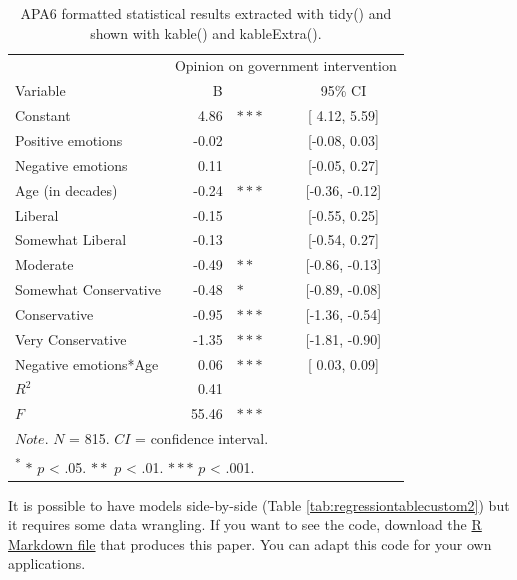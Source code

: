 \documentclass[doc,floatsintext]{apa6}
\begin{document}
\begin{table}[H]

\caption{\label{tab:regressiontablecustom}APA6 formatted statistical results extracted with tidy() and 
                 shown with kable() and kableExtra().}
\centering
\begin{tabular}[t]{lrlc}
\toprule
\multicolumn{1}{c}{ } & \multicolumn{3}{c}{Opinion on government intervention} \\
\cmidrule(l{3pt}r{3pt}){2-4}
Variable & B &  & 95\% CI\\
\midrule
Constant & 4.86 & $***$ & [ 4.12,  5.59]\\
Positive emotions & -0.02 &  & [-0.08,  0.03]\\
Negative emotions & 0.11 &  & [-0.05,  0.27]\\
Age (in decades) & -0.24 & $***$ & [-0.36, -0.12]\\
Liberal & -0.15 &  & [-0.55,  0.25]\\
\addlinespace
Somewhat Liberal & -0.13 &  & [-0.54,  0.27]\\
Moderate & -0.49 & $**$ & [-0.86, -0.13]\\
Somewhat Conservative & -0.48 & $*$ & [-0.89, -0.08]\\
Conservative & -0.95 & $***$ & [-1.36, -0.54]\\
Very Conservative & -1.35 & $***$ & [-1.81, -0.90]\\
\addlinespace
Negative emotions*Age & 0.06 & $***$ & [ 0.03,  0.09]\\
$R^2$ & 0.41 &  & \\
$F$ & 55.46 & $***$ & \\
\bottomrule
\multicolumn{4}{l}{$Note$. $N$ = 815. $CI$ = confidence interval.}\\
\multicolumn{4}{l}{\textsuperscript{*} $*$ $p$ < .05. $**$ $p$ < .01. $***$ $p$ < .001.}\\
\end{tabular}
\end{table}

It is possible to have models side-by-side (Table
\ref{tab:regressiontablecustom2}) but it requires some data wrangling.
If you want to see the code, download the
\href{https://wdenooy.github.io/Switch2R/HelpMyCollaboratorUsesR.Rmd}{R
Markdown file} that produces this paper. You can adapt this code for
your own applications.
\end{document}
